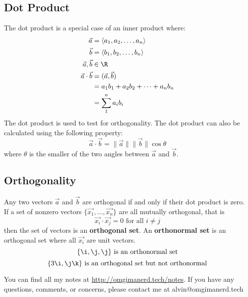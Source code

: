 \documentclass{math}
\begin{document}
\subsection*{Dot Product}
The dot product is a special case of an inner product where:
\begin{align*}
  \vec{a} &= \langle a_1,a_2,\dots,a_n \rangle \\
  \vec{b} &= \langle b_1,b_2,\dots,b_n \rangle \\
  \vec{a},\vec{b} &\in \R \\
  \vec{a}\cdot\vec{b} &= (\vec{a},\vec{b}) \\
  &= a_1b_1+a_2b_2+\dots+a_nb_n \\
  &= \sum_1^n{a_ib_i}
\end{align*}
The dot product is used to test for orthogonality. The dot product can also
be calculated using the following property:
\[ \vec{a}\cdot\vec{b} = \|\vec{a}\|\|\vec{b}\|\cos\theta \]
where \( \theta \) is the smaller of the two angles between \( \vec{a} \) and
\( \vec{b} \).

\subsection*{Orthogonality}
Any two vectors \( \vec{a} \) and \( \vec{b} \) are orthogonal if and only if
their dot product is zero. If a set of nonzero vectors
\( \{\vec{x_1},\dots,\vec{x_n}\} \) are all mutually orthogonal, that is
\[ \vec{x_i}\cdot\vec{x_j} = 0 \text{ for all } i\ne j \]
then the set of vectors is an \textbf{orthogonal set}. An \textbf{orthonormal
set} is an orthogonal set where all \( \vec{x_i} \) are unit vectors.
\[ \{\i,\j,\j\} \text{ is an orthonormal set} \]
\[ \{3\i,\j\k\} \text{ is an orthogonal set but not orthonormal} \]

\begin{center}
  You can find all my notes at \url{http://omgimanerd.tech/notes}. If you have
  any questions, comments, or concerns, please contact me at
  alvin@omgimanerd.tech
\end{center}
\end{document}
